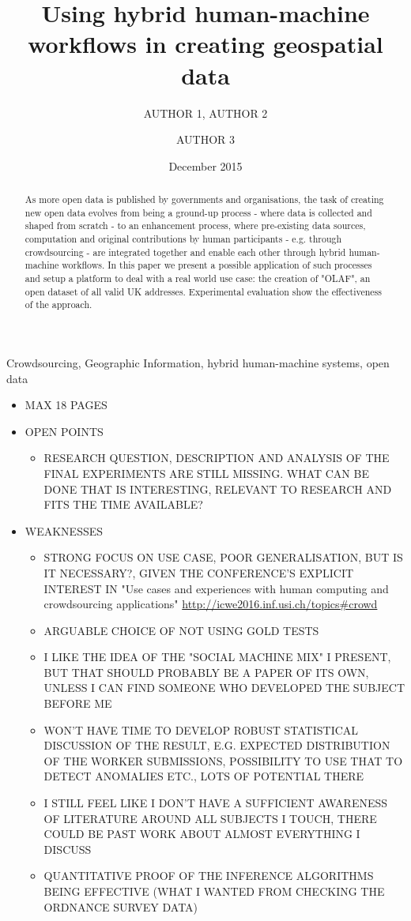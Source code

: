 \documentclass{llncs}
\title{Using hybrid human-machine workflows in creating geospatial data}
\author{AUTHOR 1\inst{1}, AUTHOR 2\inst{1} \and AUTHOR 3\inst{2}}
\institute{INSTITUTE 1 \email{EMAIL FOR AUTHOR 1} \and INSTITUTE 2}
\date{December 2015}
\begin{document}
\maketitle

\begin{abstract}
As more open data is published by governments and organisations, the task of creating new open data evolves from being a ground-up process - where data is collected and shaped from scratch - to an enhancement process, where pre-existing data sources, computation and original contributions by human participants - e.g. through crowdsourcing - are integrated together and enable each other through hybrid human-machine workflows. In this paper we present a possible application of such processes and setup a platform to deal with a real world use case: the creation of "OLAF", an open dataset of all valid UK addresses. Experimental evaluation show the effectiveness of the approach.
\end{abstract}

\begin{keywords}
Crowdsourcing, Geographic Information, hybrid human-machine systems, open data 
\end{keywords}

\begin{itemize}
    \item MAX 18 PAGES
    \item OPEN POINTS
        \begin{itemize}
            \item RESEARCH QUESTION, DESCRIPTION AND ANALYSIS OF THE FINAL EXPERIMENTS ARE STILL MISSING. WHAT CAN BE DONE THAT IS INTERESTING, RELEVANT TO RESEARCH AND FITS THE TIME AVAILABLE?
        \end{itemize}
    \item WEAKNESSES 
        \begin{itemize}
            \item STRONG FOCUS ON USE CASE, POOR GENERALISATION, BUT IS IT NECESSARY?, GIVEN THE CONFERENCE'S EXPLICIT INTEREST IN "Use cases and experiences with human computing and crowdsourcing applications" \url{http://icwe2016.inf.usi.ch/topics#crowd}
            \item ARGUABLE CHOICE OF NOT USING GOLD TESTS
            \item I LIKE THE IDEA OF THE "SOCIAL MACHINE MIX" I PRESENT, BUT THAT SHOULD PROBABLY BE A PAPER OF ITS OWN, UNLESS I CAN FIND SOMEONE WHO DEVELOPED THE SUBJECT BEFORE ME
            \item WON'T HAVE TIME TO DEVELOP ROBUST STATISTICAL DISCUSSION OF THE RESULT, E.G. EXPECTED DISTRIBUTION OF THE WORKER SUBMISSIONS, POSSIBILITY TO USE THAT TO DETECT ANOMALIES ETC., LOTS OF POTENTIAL THERE
            \item I STILL FEEL LIKE I DON'T HAVE A SUFFICIENT AWARENESS OF LITERATURE AROUND ALL SUBJECTS I TOUCH, THERE COULD BE PAST WORK ABOUT ALMOST EVERYTHING I DISCUSS
            \item QUANTITATIVE PROOF OF THE INFERENCE ALGORITHMS BEING EFFECTIVE (WHAT I WANTED FROM CHECKING THE ORDNANCE SURVEY DATA)
        \end{itemize}
\end{itemize}
\end{document}
